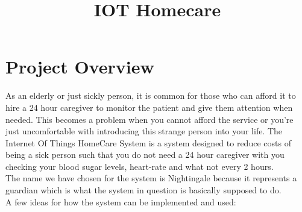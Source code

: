 \documentclass{article}
\title{IOT Homecare}
\begin{document}
    \newcommand{\titleimage}{iot.png}
    
    
    
	

	\newpage

	\section{Project Overview}

	As an elderly or just sickly person, it is common for those who can afford it to hire a 24 hour caregiver to monitor the patient and give them attention when needed. This becomes a problem when you cannot afford the service or you're just uncomfortable with introducing this strange person into your life. The Internet Of Things HomeCare System is a system designed to reduce costs of being a sick person such that you do not need a 24 hour caregiver with you checking your blood sugar levels, heart-rate and what not every 2 hours. \\
	
	The name we have chosen for the system is Nightingale because it represents a guardian which is what the system in question is basically supposed to do.\\
	
	A few ideas for how the system can be implemented and used: \\
	
\end{document}

